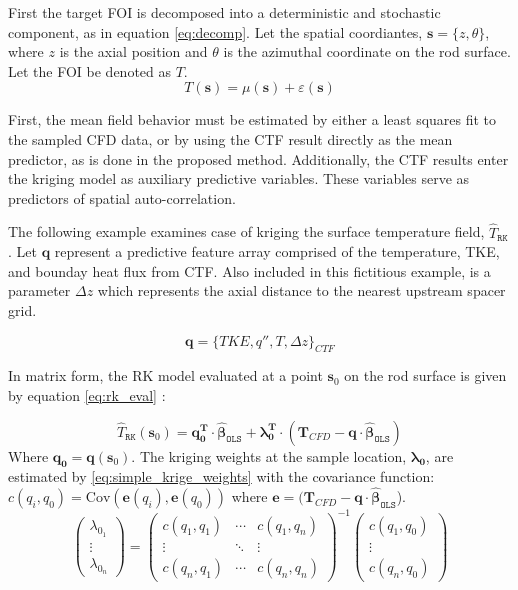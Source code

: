 First the target FOI is decomposed into a deterministic and stochastic component, as in equation \ref{eq:decomp}.
Let the spatial coordiantes, $\mathbf{s} = \{z, \theta\}$,
where $z$ is the axial position and $\theta$ is the azimuthal coordinate on the rod surface. Let the FOI be denoted as $T$.
\begin{equation}
T(\mathbf s) = \mu(\mathbf s) + \varepsilon(\mathbf s)
\label{eq:decomp}
\end{equation}

First, the mean field behavior must be estimated by either a least squares fit to the sampled CFD data, or by using the CTF result directly as the mean predictor, as is done in the proposed method. 
Additionally, the CTF results enter the kriging model as auxiliary predictive variables.  These variables serve as predictors of spatial auto-correlation.

The following example examines case of kriging the surface temperature field, $\hat T_\mathtt{RK}$.
Let $\mathbf{q}$ represent a predictive feature array comprised of the temperature,
TKE, and bounday heat flux from CTF.  Also included in this fictitious example, is a parameter $\Delta z$ which represents the axial distance to the nearest upstream spacer grid.

\begin{equation}
\mathbf{q} = \{TKE, q'', T, \Delta z \}_{CTF}
\end{equation}

In matrix form, the RK model evaluated at a point $\mathbf{s}_0 $ on the rod surface is given by equation \ref{eq:rk_eval} \cite{Hengl07}:

\begin{equation}
\hat T_\mathtt{RK}(\mathbf{s}_0 ) = \mathbf{q}_\mathbf{0}^\mathbf{T} \cdot \mathbf{\hat \beta}_\mathtt{OLS} + \mathbf{\lambda }_\mathbf{0}^\mathbf{T} \cdot (\mathbf T_{CFD}
- \mathbf{q} \cdot \mathbf{\hat \beta }_\mathtt{OLS} )
\label{eq:rk_eval}
\end{equation}
Where $\mathbf{q}_\mathbf{0}= \mathbf{q}(\mathbf s_0)$. The kriging weights at the sample location, $\mathbf{\lambda_0}$, are estimated by \ref{eq:simple_krige_weights} with the covariance function: $c(q_i, q_0)= \mathrm{Cov}(\mathbf e(q_i), \mathbf e(q_0))$ where $\mathbf e = (\mathbf T_{CFD} - \mathbf{q} \cdot \mathbf{\hat \beta }_\mathtt{OLS}$). 
\begin{equation}
\begin{pmatrix}\lambda_{0_1} \\ \vdots \\ \lambda_{0_n} \end{pmatrix}=
\begin{pmatrix}c(q_1,q_1) & \cdots & c(q_1,q_n) \\
\vdots & \ddots & \vdots  \\
c(q_n,q_1) & \cdots & c(q_n,q_n) 
\end{pmatrix}^{-1}
\begin{pmatrix}c(q_1,q_0) \\ \vdots \\ c(q_n,q_0) \end{pmatrix}
\label{eq:simple_krige_weights}
\end{equation}

